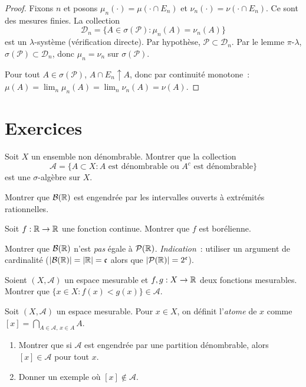 \begin{proof}
Fixons $n$ et posons $\mu_n(\cdot) = \mu(\cdot \cap E_n)$ et
$\nu_n(\cdot) = \nu(\cdot \cap E_n)$. Ce sont des mesures finies.
La collection
\[
\mathcal{D}_n = \{A \in \sigma(\mathcal{P}) : \mu_n(A) = \nu_n(A)\}
\]
est un $\lambda$-syst\`eme (v\'erification directe). Par hypoth\`ese,
$\mathcal{P} \subset \mathcal{D}_n$. Par le lemme $\pi$-$\lambda$,
$\sigma(\mathcal{P}) \subset \mathcal{D}_n$, donc $\mu_n = \nu_n$ sur
$\sigma(\mathcal{P})$.

Pour tout $A \in \sigma(\mathcal{P})$, $A \cap E_n \uparrow A$, donc par
continuit\'e monotone~:
$\mu(A) = \lim_n \mu_n(A) = \lim_n \nu_n(A) = \nu(A)$.
\end{proof}

\section{Exercices}

\begin{exercice}
Soit $X$ un ensemble non d\'enombrable. Montrer que la collection
\[
\mathcal{A} = \{A \subset X : A \text{ est d\'enombrable ou } A^c \text{ est d\'enombrable}\}
\]
est une $\sigma$-alg\`ebre sur $X$.
\end{exercice}

\begin{exercice}
Montrer que $\mathcal{B}(\mathbb{R})$ est engendr\'ee par les intervalles ouverts \`a
extr\'emit\'es rationnelles.
\end{exercice}

\begin{exercice}
Soit $f : \mathbb{R} \to \mathbb{R}$ une fonction continue. Montrer que $f$ est bor\'elienne.
\end{exercice}

\begin{exercice}
Montrer que $\mathcal{B}(\mathbb{R})$ n'est \emph{pas} \'egale \`a $\mathcal{P}(\mathbb{R})$.
\emph{Indication}~: utiliser un argument de cardinalit\'e ($\left| \mathcal{B}(\mathbb{R}) \right| =
\left| \mathbb{R} \right| = \mathfrak{c}$ alors que $\left| \mathcal{P}(\mathbb{R}) \right| = 2^{\mathfrak{c}}$).
\end{exercice}

\begin{exercice}
Soient $(X, \mathcal{A})$ un espace mesurable et $f, g : X \to \mathbb{R}$ deux fonctions
mesurables. Montrer que $\{x \in X : f(x) < g(x)\} \in \mathcal{A}$.
\end{exercice}

\begin{exercice}
Soit $(X, \mathcal{A})$ un espace mesurable. Pour $x \in X$, on d\'efinit
l'\emph{atome} de $x$ comme $[x] = \bigcap_{A \in \mathcal{A},\, x \in A} A$.
\begin{enumerate}
    \item Montrer que si $\mathcal{A}$ est engendr\'ee par une partition
    d\'enombrable, alors $[x] \in \mathcal{A}$ pour tout $x$.
    \item Donner un exemple o\`u $[x] \notin \mathcal{A}$.
\end{enumerate}
\end{exercice}
